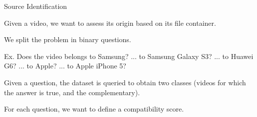 \begin{tframe}{Source Identification}

\vspace{0.1cm}

Given a video, we want to assess its origin based on its file container.

\vspace{0.5cm}

We split the problem in binary questions.

\vspace{0.5cm}

Ex. Does the video belongs to Samsung? \newline
	 ... to Samsung Galaxy S3? \newline
	 ... to Huawei G6? \newline
	 ... to Apple? \newline
	 ... to Apple iPhone 5? \newline
	 
\vspace{0.1cm}

Given a question, the dataset is queried to obtain two classes (videos for which the answer is true, and the complementary).

\vspace{0.5cm}

For each question, we want to define a compatibility score.

\end{tframe}

